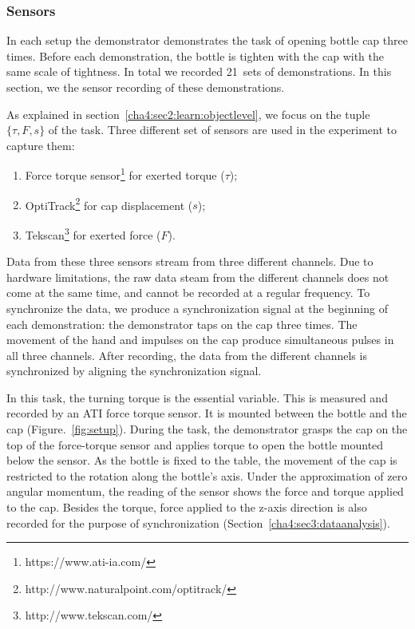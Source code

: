 \subsubsection{Sensors}
\label{cha4:sec3:experimentsetup:sensor}
In each setup the demonstrator demonstrates the task of opening bottle
cap three times. Before each demonstration, the bottle is tighten with
the cap with the same scale of tightness. In total we recorded 21~sets
of demonstrations. In this section, we the sensor recording of these
demonstrations.



As explained in section~\ref{cha4:sec2:learn:objectlevel}, we focus on the tuple $\{\tau,F,s\}$ of the task. Three different set of sensors are used in the experiment to capture them:

\begin{enumerate}
\item Force torque sensor\footnote{https://www.ati-ia.com/} for exerted torque ($\tau$);
\item OptiTrack\footnote{http://www.naturalpoint.com/optitrack/} for cap displacement ($s$);
\item Tekscan\footnote{http://www.tekscan.com/} for exerted force ($F$).
\end{enumerate}

Data from these three sensors stream from three different
channels. Due to hardware limitations, the raw data steam from the
different channels does not come at the same time, and cannot be
recorded at a regular frequency. To synchronize the data, we produce a
synchronization signal at the beginning of each demonstration: the
demonstrator taps on the cap three times. The movement of the hand and
impulses on the cap produce simultaneous pulses in all three
channels. After recording, the data from the different channels is
synchronized by aligning the synchronization signal.

In this task, the turning torque is the essential variable. This is
measured and recorded by an ATI force torque sensor. It is mounted
between the bottle and the cap (Figure.~\ref{fig:setup}). During the
task, the demonstrator grasps the cap on the top of the force-torque
sensor and applies torque to open the bottle mounted below the
sensor. As the bottle is fixed to the table, the movement of the cap
is restricted to the rotation along the bottle's axis. Under the
approximation of zero angular momentum, the reading of the sensor
shows the force and torque applied to the cap. Besides the torque,
force applied to the z-axis direction is also recorded for the purpose
of synchronization  (Section~\ref{cha4:sec3:dataanalysis}).

